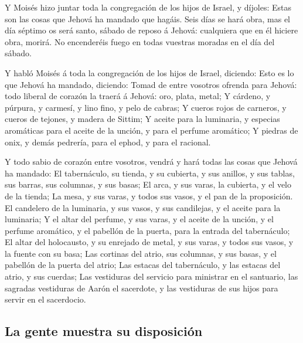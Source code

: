  Y Moisés hizo juntar toda la congregación de los hijos de
Israel, y díjoles: Estas son las cosas que Jehová ha mandado que hagáis.
 Seis días se hará obra, mas el día séptimo os será santo,
sábado de reposo á Jehová: cualquiera que en él hiciere obra, morirá.
 No encenderéis fuego en todas vuestras moradas en el día
del sábado.

 Y habló Moisés á toda la congregación de los hijos de
Israel, diciendo: Esto es lo que Jehová ha mandado, diciendo:
 Tomad de entre vosotros ofrenda para Jehová: todo liberal
de corazón la traerá á Jehová: oro, plata, metal;  Y
cárdeno, y púrpura, y carmesí, y lino fino, y pelo de cabras;
 Y cueros rojos de carneros, y cueros de tejones, y madera
de Sittim;  Y aceite para la luminaria, y especias
aromáticas para el aceite de la unción, y para el perfume aromático;
 Y piedras de onix, y demás pedrería, para el ephod, y
para el racional.

 Y todo sabio de corazón entre vosotros, vendrá y hará
todas las cosas que Jehová ha mandado:  El tabernáculo,
su tienda, y su cubierta, y sus anillos, y sus tablas, sus barras, sus
columnas, y sus basas;  El arca, y sus varas, la
cubierta, y el velo de la tienda;  La mesa, y sus varas,
y todos sus vasos, y el pan de la proposición.  El
candelero de la luminaria, y sus vasos, y sus candilejas, y el aceite
para la luminaria;  Y el altar del perfume, y sus varas,
y el aceite de la unción, y el perfume aromático, y el pabellón de la
puerta, para la entrada del tabernáculo;  El altar del
holocausto, y su enrejado de metal, y sus varas, y todos sus vasos, y la
fuente con su basa;  Las cortinas del atrio, sus
columnas, y sus basas, y el pabellón de la puerta del atrio;
 Las estacas del tabernáculo, y las estacas del atrio, y
sus cuerdas;  Las vestiduras del servicio para ministrar
en el santuario, las sagradas vestiduras de Aarón el sacerdote, y las
vestiduras de sus hijos para servir en el sacerdocio.

\hypertarget{la-gente-muestra-su-disposiciuxf3n}{%
\subsection{La gente muestra su
disposición}\label{la-gente-muestra-su-disposiciuxf3n}}

